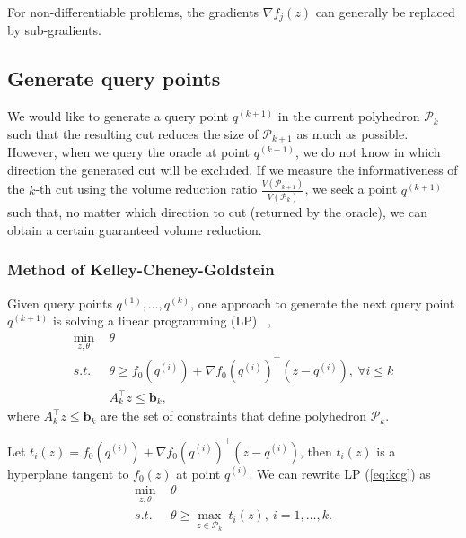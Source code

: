 For non-differentiable problems, the gradients $\nabla f_j(z)$ can generally be replaced by sub-gradients.


\subsection{Generate query points}
\label{sec:query}

We would like to generate a query point $q^{(k+1)}$ in the current polyhedron $\mathcal{P}_{k}$ such that 
the resulting cut reduces the size of $\mathcal{P}_{k+1}$ as much as possible.
However, when we query the oracle at point $q^{(k+1)}$, we do not know in which direction the generated cut will be excluded.
If we measure the informativeness of the $k$-th cut using the volume reduction ratio $\frac{V(\mathcal{P}_{k+1})}{V(\mathcal{P}_{k})}$,
we seek a point $q^{(k+1)}$ such that, no matter which direction to cut (returned by the oracle), we can obtain a certain guaranteed volume reduction.


\subsubsection{Method of Kelley-Cheney-Goldstein}
\label{sec:kcg}

Given query points $q^{(1)}, \dots, q^{(k)}$, one approach to generate the next query point $q^{(k+1)}$ is solving a linear programming (LP)
~\cite{wulff2013analytic},
\begin{equation}
\label{eq:kcg}
\begin{aligned}
\min_{z,\theta} ~& \theta  \\
s.t.~~   ~& \theta \ge f_0(q^{(i)}) + \nabla f_0(q^{(i)})^\top (z - q^{(i)}),~ \forall i \le k \\
          & A_k^\top z \le \mathbf{b}_k,
\end{aligned}
\end{equation}
where $A_k^\top z \le \mathbf{b}_k$ are the set of constraints that define polyhedron $\mathcal{P}_k$.

Let $t_i(z) = f_0(q^{(i)}) + \nabla f_0(q^{(i)})^\top (z - q^{(i)})$,
then $t_i(z)$ is a hyperplane tangent to $f_0(z)$ at point $q^{(i)}$.
We can rewrite LP (\ref{eq:kcg}) as
\begin{equation*}
\begin{aligned}
\min_{z,\theta} ~& \theta \\
s.t.~~ ~& \theta \ge \max_{z \in \mathcal{P}_k}~ t_i(z),~ i=1,\dots,k.
\end{aligned}
\end{equation*}

